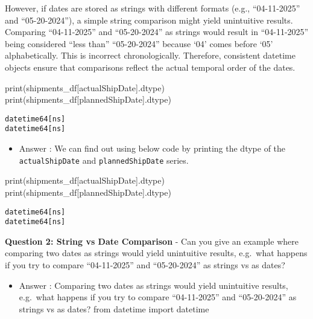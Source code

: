 \documentclass[
  letterpaper,
  DIV=11,
  numbers=noendperiod]{scrartcl}
\newenvironment{Shaded}{\begin{snugshade}}{\end{snugshade}}
\newcommand{\BuiltInTok}[1]{\textcolor[rgb]{0.00,0.23,0.31}{#1}}
\newcommand{\NormalTok}[1]{\textcolor[rgb]{0.00,0.23,0.31}{#1}}
\newcommand{\StringTok}[1]{\textcolor[rgb]{0.13,0.47,0.30}{#1}}
\providecommand{\tightlist}{%
  \setlength{\itemsep}{0pt}\setlength{\parskip}{0pt}}
\begin{document}
\begin{tcolorbox}
However, if dates are stored as strings with different formats (e.g.,
``04-11-2025'' and ``05-20-2024''), a simple string comparison might
yield unintuitive results. Comparing ``04-11-2025'' and ``05-20-2024''
as strings would result in ``04-11-2025'' being considered ``less than''
``05-20-2024'' because `04' comes before `05' alphabetically. This is
incorrect chronologically. Therefore, consistent datetime objects ensure
that comparisons reflect the actual temporal order of the dates.

\begin{Shaded}
\begin{Highlighting}[]
\BuiltInTok{print}\NormalTok{(shipments\_df[}\StringTok{\textquotesingle{}actualShipDate\textquotesingle{}}\NormalTok{].dtype)}
\BuiltInTok{print}\NormalTok{(shipments\_df[}\StringTok{\textquotesingle{}plannedShipDate\textquotesingle{}}\NormalTok{].dtype)}
\end{Highlighting}
\end{Shaded}

\begin{verbatim}
datetime64[ns]
datetime64[ns]
\end{verbatim}

\begin{itemize}
\tightlist
\item
  Answer : We can find out using below code by printing the dtype of the
  \texttt{actualShipDate} and \texttt{plannedShipDate} series.
\end{itemize}

\begin{Shaded}
\begin{Highlighting}[]
\BuiltInTok{print}\NormalTok{(shipments\_df[}\StringTok{\textquotesingle{}actualShipDate\textquotesingle{}}\NormalTok{].dtype)}
\BuiltInTok{print}\NormalTok{(shipments\_df[}\StringTok{\textquotesingle{}plannedShipDate\textquotesingle{}}\NormalTok{].dtype)}
\end{Highlighting}
\end{Shaded}

\begin{verbatim}
datetime64[ns]
datetime64[ns]
\end{verbatim}

\textbf{Question 2: String vs Date Comparison} - Can you give an example
where comparing two dates as strings would yield unintuitive results,
e.g.~what happens if you try to compare ``04-11-2025'' and
``05-20-2024'' as strings vs as dates?

\begin{itemize}
\tightlist
\item
  Answer : Comparing two dates as strings would yield unintuitive
  results, e.g.~what happens if you try to compare ``04-11-2025'' and
  ``05-20-2024'' as strings vs as dates? from datetime import datetime
\end{itemize}


\end{tcolorbox}
\end{document}
